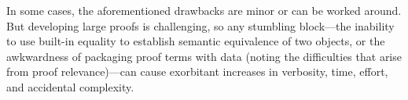 In some cases, the aforementioned drawbacks are minor or can be worked around.
%
But developing large proofs is challenging, so any stumbling block---the inability to use built-in equality to establish semantic equivalence of two objects, or the awkwardness of packaging proof terms with data (noting the difficulties that arise from proof relevance)---can cause exorbitant increases in verbosity, time, effort, and accidental complexity.






